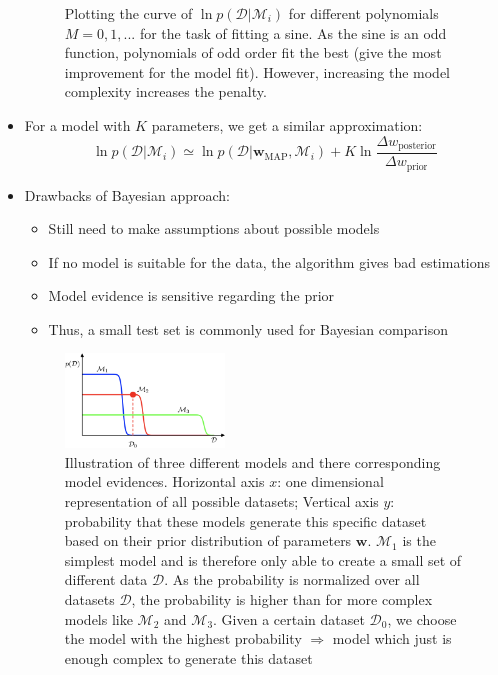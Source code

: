 \begin{itemize}
\begin{figure}[ht]
	 	\caption{Plotting the curve of $\ln p\left(\mathcal{D}|\mathcal{M}_i\right)$ for different polynomials $M=0,1,...$ for the task of fitting a sine. As the sine is an odd function, polynomials of odd order fit the best (give the most improvement for the model fit). However, increasing the model complexity increases the penalty.}
	 \end{figure}
	 \item For a model with $K$ parameters, we get a similar approximation: 
	 $$\ln p\left(\mathcal{D}|\mathcal{M}_i\right) \simeq \ln p\left(\mathcal{D}|\bm{w}_{\text{MAP}}, \mathcal{M}_i\right) + K \ln \frac{\Delta w_{\text{posterior}}}{\Delta w_{\text{prior}}}$$
	 \item Drawbacks of Bayesian approach:
	 \begin{itemize}
	 	\item Still need to make assumptions about possible models
	 	\item If no model is suitable for the data, the algorithm gives bad estimations
	 	\item Model evidence is sensitive regarding the prior
	 	\item Thus, a small test set is commonly used for Bayesian comparison
	 \end{itemize}
	 \begin{figure}[ht]
	 	\centering
	 	\includegraphics[width=0.4\textwidth]{figures/bayesian_model_comparison.png}
	 	\caption{Illustration of three different models and there corresponding model evidences. Horizontal axis $x$: one dimensional representation of all possible datasets; Vertical axis $y$: probability that these models generate this specific dataset based on their prior distribution of parameters $\bm{w}$. $\mathcal{M}_1$ is the simplest model and is therefore only able to create a small set of different data $\mathcal{D}$. As the probability is normalized over all datasets $\mathcal{D}$, the probability is higher than for more complex models like $\mathcal{M}_2$ and $\mathcal{M}_3$. Given a certain dataset $\mathcal{D}_0$, we choose the model with the highest probability $\Rightarrow$ model which just is enough complex to generate this dataset}
	 \end{figure}
 	
\end{itemize}
